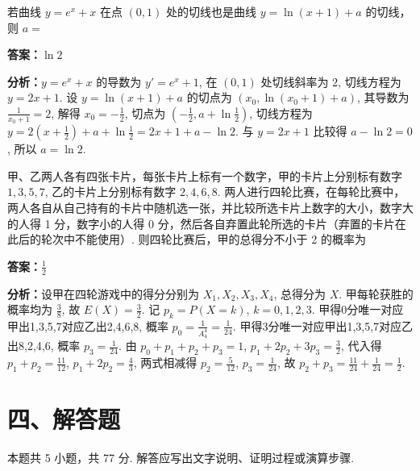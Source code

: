 \begin{question}[points=5]
若曲线 $y = e^x + x$ 在点 $(0,1)$ 处的切线也是曲线 $y = \ln(x+1) + a$ 的切线，则 $a =$
\fillin[{$\ln 2$}]
\begin{solution}
\textbf{答案：}$\ln 2$

\textbf{分析：}$y = e^x + x$ 的导数为 $y' = e^x + 1$, 在 $(0,1)$ 处切线斜率为 $2$, 切线方程为 $y = 2x + 1$. 设 $y = \ln(x+1) + a$ 的切点为 $(x_0, \ln(x_0+1)+a)$, 其导数为 $\frac{1}{x_0+1} = 2$, 解得 $x_0 = -\frac{1}{2}$, 切点为 $(-\frac{1}{2}, a + \ln\frac{1}{2})$, 切线方程为 $y = 2(x+\frac{1}{2}) + a + \ln\frac{1}{2} = 2x + 1 + a - \ln 2$. 与 $y=2x+1$ 比较得 $a - \ln 2 = 0$, 所以 $a = \ln 2$.
\end{solution}
\end{question}

\begin{question}[points=5]
甲、乙两人各有四张卡片，每张卡片上标有一个数字，甲的卡片上分别标有数字 $1,3,5,7$, 乙的卡片上分别标有数字 $2,4,6,8$. 两人进行四轮比赛，在每轮比赛中，两人各自从自己持有的卡片中随机选一张，并比较所选卡片上数字的大小，数字大的人得 1 分，数字小的人得 0 分，然后各自弃置此轮所选的卡片（弃置的卡片在此后的轮次中不能使用）. 则四轮比赛后，甲的总得分不小于 2 的概率为
\fillin[{$\frac{1}{2}$}]
\begin{solution}
\textbf{答案：}$\frac{1}{2}$

\textbf{分析：}设甲在四轮游戏中的得分分别为 $X_1,X_2,X_3,X_4$, 总得分为 $X$. 甲每轮获胜的概率均为 $\frac{3}{8}$, 故 $E(X) = \frac{3}{2}$. 记 $p_k = P(X=k)$, $k=0,1,2,3$. 甲得0分唯一对应甲出1,3,5,7对应乙出2,4,6,8, 概率 $p_0 = \frac{1}{A_4^4} = \frac{1}{24}$. 甲得3分唯一对应甲出1,3,5,7对应乙出8,2,4,6, 概率 $p_3 = \frac{1}{24}$. 由 $p_0+p_1+p_2+p_3=1$, $p_1+2p_2+3p_3 = \frac{3}{2}$, 代入得 $p_1+p_2 = \frac{11}{12}$, $p_1+2p_2 = \frac{4}{3}$, 两式相减得 $p_2 = \frac{5}{12}$, $p_3 = \frac{1}{24}$, 故 $p_2+p_3 = \frac{11}{24} + \frac{1}{24} = \frac{1}{2}$.
\end{solution}
\end{question}

\section*{四、解答题}
本题共 5 小题，共 77 分. 解答应写出文字说明、证明过程或演算步骤.

